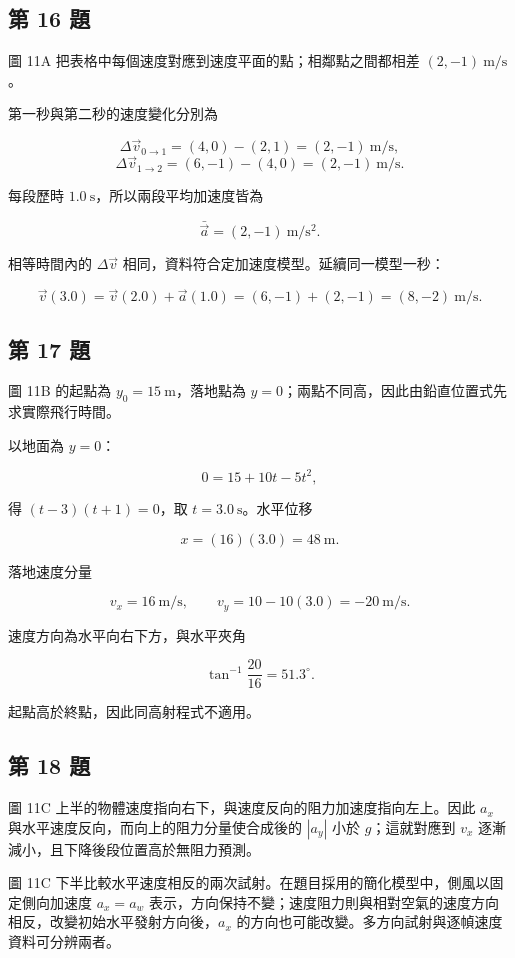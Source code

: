 \documentclass[11pt,a4paper]{article}
\begin{document}
\subsection{第 16 題}\label{ux7b2c-16-ux984c}

圖 11A 把表格中每個速度對應到速度平面的點；相鄰點之間都相差 \((2,-1)\ \mathrm{m/s}\)。

第一秒與第二秒的速度變化分別為

\[
\Delta\vec v_{0\to1}=(4,0)-(2,1)=(2,-1)\ \mathrm{m/s},
\]
\[
\Delta\vec v_{1\to2}=(6,-1)-(4,0)=(2,-1)\ \mathrm{m/s}.
\]

每段歷時 \(1.0\ \mathrm s\)，所以兩段平均加速度皆為

\[
\bar{\vec a}=(2,-1)\ \mathrm{m/s^2}.
\]

相等時間內的 \(\Delta\vec v\) 相同，資料符合定加速度模型。延續同一模型一秒：

\[
\vec v(3.0)=\vec v(2.0)+\vec a(1.0)=(6,-1)+(2,-1)=(8,-2)\ \mathrm{m/s}.
\]

\subsection{第 17 題}\label{ux7b2c-17-ux984c}

圖 11B 的起點為 \(y_0=15\ \mathrm m\)，落地點為 \(y=0\)；兩點不同高，因此由鉛直位置式先求實際飛行時間。

以地面為 \(y=0\)：

\[
0=15+10t-5t^2,
\]

得 \((t-3)(t+1)=0\)，取 \(t=3.0\ \mathrm s\)。水平位移

\[
x=(16)(3.0)=48\ \mathrm m.
\]

落地速度分量

\[
v_x=16\ \mathrm{m/s},\qquad v_y=10-10(3.0)=-20\ \mathrm{m/s}.
\]

速度方向為水平向右下方，與水平夾角

\[
\tan^{-1}\frac{20}{16}=51.3^\circ.
\]

起點高於終點，因此同高射程式不適用。

\subsection{第 18 題}\label{ux7b2c-18-ux984c}

圖 11C 上半的物體速度指向右下，與速度反向的阻力加速度指向左上。因此 \(a_x\) 與水平速度反向，而向上的阻力分量使合成後的 \(|a_y|\) 小於 \(g\)；這就對應到 \(v_x\) 逐漸減小，且下降後段位置高於無阻力預測。

圖 11C 下半比較水平速度相反的兩次試射。在題目採用的簡化模型中，側風以固定側向加速度 \(a_x=a_w\) 表示，方向保持不變；速度阻力則與相對空氣的速度方向相反，改變初始水平發射方向後，\(a_x\) 的方向也可能改變。多方向試射與逐幀速度資料可分辨兩者。
\end{document}
